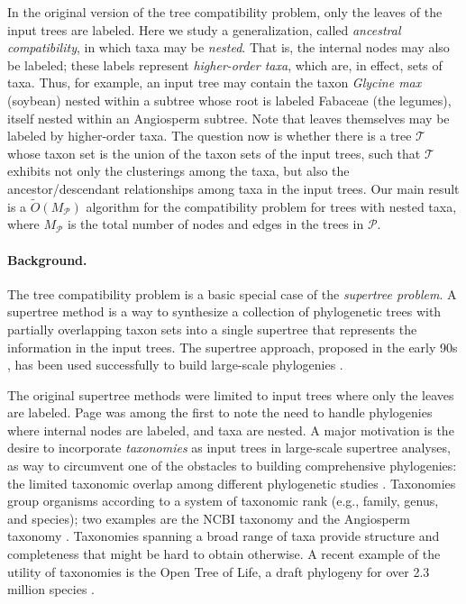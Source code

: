 \documentclass[11pt]{article}
\newcommand{\MP}{\ensuremath{M_\P}} \newcommand{\TG}{\ensuremath{\Gamma}} \newcommand{\incompatible}{\texttt{incompatible}}
\renewcommand{\P}{\ensuremath{\mathcal{P}}}
\newcommand{\T}{\ensuremath{\mathcal{T}}}
\theoremstyle{definition}
\begin{document}
In the original version of the tree compatibility problem, only the leaves of the input trees are labeled. 
Here we study a generalization, called \emph{ancestral compatibility}, in which taxa may be \emph{nested}.  That is, the internal nodes may also be labeled; these labels represent \emph{higher-order taxa}, which are, in effect, sets of taxa.  Thus, for example,   an input tree may contain the taxon \emph{Glycine max} (soybean) nested within a subtree whose root is labeled Fabaceae (the legumes), itself nested within an Angiosperm subtree.  Note that leaves themselves may be labeled by higher-order taxa.  The question now is whether there is a tree $\T$  whose taxon set is the union of the taxon sets of the input trees, such that $\T$ exhibits not only the clusterings among the taxa, but also the ancestor/descendant relationships among taxa in the input trees.  Our main result is a $\tilde{O}(\MP)$ algorithm for the compatibility problem for trees with nested taxa, where $\MP$ is the total number of nodes and edges in the trees in $\P$.

\vspace{-1.5\parsep}

\paragraph{Background.}  The tree compatibility problem is a basic special case of the \emph{supertree problem}.
A supertree method is a way to synthesize a collection of phylogenetic trees with partially overlapping taxon sets into a single supertree that represents the information in the input trees.  The supertree approach, proposed
in the early 90s \cite{Baum:1992,Ragan:1992}, has been used successfully to build large-scale phylogenies \cite{BinindaEmonds:Nature:07}. 

The original supertree methods were limited to input trees where only the leaves are labeled.
Page \cite{Page2004} was among the first to note the need to handle phylogenies where internal nodes are labeled, and taxa are nested.  A major motivation is the desire to incorporate \emph{taxonomies} as input trees in large-scale supertree analyses, as way to circumvent one of the obstacles to building comprehensive phylogenies: the limited taxonomic overlap among different phylogenetic studies \cite{Sanderson:2008}. Taxonomies group organisms according to a system of taxonomic rank  (e.g., family, genus, and species); two examples are the NCBI taxonomy \cite{NCBI2009} and the Angiosperm taxonomy \cite{APG2016}.  Taxonomies spanning a broad range of taxa provide structure and completeness that might be hard to obtain otherwise.    
A recent example of the utility of taxonomies is the Open Tree of Life, a draft phylogeny for over 2.3 million species \cite{HinchliffPNAS2015}.
\end{document}

